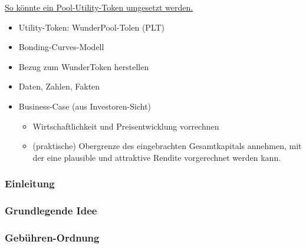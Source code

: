 
\vspace{0.3cm}

\href{https://medium.com/atchai/can-we-save-the-utility-token-55ef639370cf}{So könnte ein Pool-Utility-Token umgesetzt werden.}

\vspace{0.3cm}

\begin{itemize}
	\item Utility-Token: WunderPool-Tolen (PLT)
	\item Bonding-Curves-Modell
	\item Bezug zum WunderToken herstellen
	\item Daten, Zahlen, Fakten 
	\item Business-Case (aus Investoren-Sicht)
	\begin{itemize}
		\item Wirtschaftlichkeit und Preisentwicklung vorrechnen
		\item (praktische) Obergrenze des eingebrachten Gesamtkapitals annehmen, mit der eine plausible und attraktive Rendite vorgerechnet werden kann.
	\end{itemize}
\end{itemize}

\newpage

\subsubsection{Einleitung}


\vspace{0.5cm}



\subsubsection{Grundlegende Idee}



\vspace{0.5cm}

\subsubsection{Gebühren-Ordnung}



